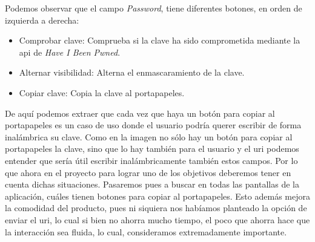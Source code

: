 Podemos observar que el campo \textit{Password}, tiene diferentes botones, en orden de izquierda a derecha:
\begin{itemize}
    \item Comprobar clave:
    Comprueba si la clave ha sido comprometida mediante la \gls{api} de \textit{Have I Been Pwned}. \cite{pwnedpasswords}%
    \item Alternar visibilidad:
    Alterna el enmascaramiento de la clave.
    \item Copiar clave:
    Copia la clave al portapapeles.
\end{itemize}
De aquí podemos extraer que cada vez que haya un botón para copiar al portapapeles es un caso de uso donde el usuario podría querer escribir de forma inalámbrica su clave. Como en la imagen no sólo hay un botón para copiar al portapapeles la clave, sino que lo hay también para el usuario y el \gls{uri} podemos entender que sería útil escribir inalámbricamente también estos campos. Por lo que ahora en el proyecto para lograr uno de los objetivos deberemos tener en cuenta dichas situaciones. Pasaremos pues a buscar en todas las pantallas de la aplicación, cuáles tienen botones para copiar al portapapeles. Esto además mejora la comodidad del producto, pues ni siquiera nos habíamos planteado la opción de enviar el \gls{uri}, lo cual si bien no ahorra mucho tiempo, el poco que ahorra hace que la interacción sea fluida, lo cual, consideramos extremadamente importante.

